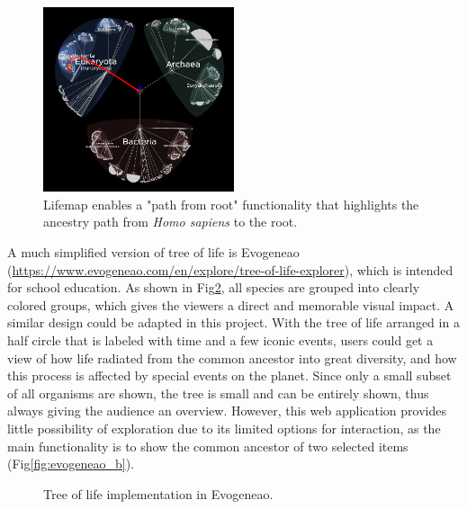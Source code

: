 \documentclass[11pt, a4paper,oneside,chapterprefix=false]{scrbook}
\begin{document}
\begin{figure}[h]
	\centering
	\includegraphics[width=0.5\textwidth]{figures/related_work/lifemap}
	\caption{Lifemap enables a "path from root" functionality that highlights the ancestry path from \textit{Homo sapiens} to the root. }
	\label{fig:lifemap}
\end{figure}

A much simplified version of tree of life is Evogeneao (\url{https://www.evogeneao.com/en/explore/tree-of-life-explorer}), which is intended for school education. As shown in Fig\ref{fig:evogeneao}, all species are grouped into clearly colored groups, which gives the viewers a direct and memorable visual impact. A similar design could be adapted in this project. With the tree of life arranged in a half circle that is labeled with time and a few iconic events, users could get a view of how life radiated from the common ancestor into great diversity, and how this process is affected by special events on the planet. Since only a small subset of all organisms are shown, the tree is small and can be entirely shown, thus always giving the audience an overview. However, this web application provides little possibility of exploration due to its limited options for interaction, as the main functionality is to show the common ancestor of two selected items (Fig\ref{fig:evogeneao_b}).

\begin{figure}[h]
	\centering
	\hfill
	\caption{Tree of life implementation in Evogeneao. }
	\label{fig:evogeneao}
\end{figure}
\end{document}
